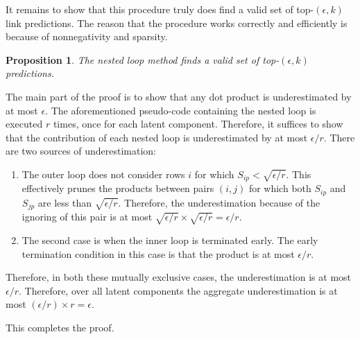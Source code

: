 \documentclass[10pt,journal,compsoc]{IEEEtran}
\newcommand{\eat}[1]{}
\newtheorem{lemma}{Lemma}
\newtheorem{prop}{Proposition}
\begin{document}
\eat{%
\begin{lemma}
For a $n \times r$ matrix $F$, the complexity of the top-$(\epsilon, k)$
prediction is $O(nn')$, where $n'$ is the number of entries of $F$
which are greater than $\sqrt{ \epsilon / r}$.
\end{lemma}
\begin{IEEEproof}
For the $p$th column of $F$, the {\bf if} statement in the nested loop
is executed $f_p ( 2n_p - f_p -1) / 2$ times. There are $r$ columns in $F$,
hence, the {\bf if} statement will be executed
$\sum_{p = 1}^{r} f_p ( 2n_p - f_p -1) / 2 $ times.
$\sum_{p = 1}^{r} f_p ( 2n_p - f_p -1) / 2 \leq n\sum_{p = 1}^{r}f_{p}$, and
$\sum_{p = 1}^{r} f_p$ is equal to the number $n'$. Therefore, the complexity of
top-$(\epsilon, k)$ prediction is $O(nn')$.
\end{IEEEproof} }

 It remains to show that this procedure truly does find a valid set of  top-$(\epsilon,
k)$ link predictions. The reason that the procedure works correctly
and efficiently  is because of nonnegativity and sparsity.

\begin{prop}
The nested loop method finds a valid set of top-$(\epsilon, k)$
predictions.
\end{prop}
\begin{IEEEproof}
The main part of the proof is to show that any dot product is
underestimated by at most  $\epsilon$. The aforementioned pseudo-code
containing the  nested loop is executed $r$ times, once for each
latent component. Therefore, it suffices to show that the
contribution of each nested loop is underestimated by at most
$\epsilon/r$. There are two sources of underestimation:
\begin{enumerate}
\item  The outer loop does not consider rows $i$ for which $S_{ip} <
\sqrt{\epsilon/r}$. This effectively prunes the products between
pairs $(i, j)$ for which both $S_{ip}$ and $S_{jp}$ are less
than $\sqrt{\epsilon/r}$. Therefore, the underestimation because of
the ignoring of this pair is at most $\sqrt{\epsilon/r} \times
\sqrt{\epsilon/r} = \epsilon/r$.
\item The second case is when the inner loop is terminated early.
The early termination condition in this case is that the product is
at most $\epsilon/r$.
\end{enumerate}
Therefore, in both these mutually exclusive cases, the
underestimation is at most $\epsilon/r$. Therefore, over all latent
components the aggregate underestimation is at most
$(\epsilon/r)\times r= \epsilon$.

This completes the proof.
\end{IEEEproof}
\end{document}
